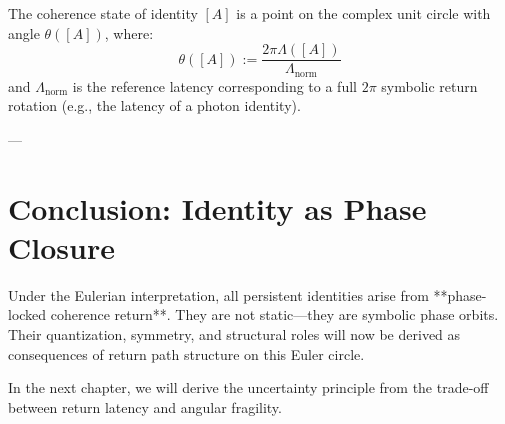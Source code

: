 \begin{definition}
The coherence state of identity $[A]$ is a point on the complex unit circle with angle $\theta([A])$, where:
\[
\theta([A]) := \frac{2\pi \Lambda([A])}{\Lambda_{\text{norm}}}
\]
and $\Lambda_{\text{norm}}$ is the reference latency corresponding to a full $2\pi$ symbolic return rotation (e.g., the latency of a photon identity).
\end{definition}

---

\section{Conclusion: Identity as Phase Closure}

Under the Eulerian interpretation, all persistent identities arise from **phase-locked coherence return**. They are not static—they are symbolic phase orbits. Their quantization, symmetry, and structural roles will now be derived as consequences of return path structure on this Euler circle.

In the next chapter, we will derive the uncertainty principle from the trade-off between return latency and angular fragility.
